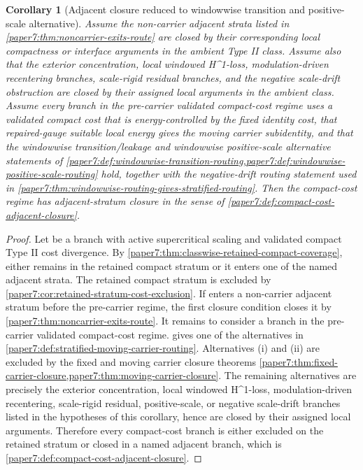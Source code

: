 \documentclass[11pt]{amsart}
\def\({}%
\def\){}%
\theoremstyle{plain}
\newtheorem{corollary}[corollary]{Corollary}
\theoremstyle{definition}
\theoremstyle{remark}
\begin{document}
\begin{corollary}[Adjacent closure reduced to windowwise transition and positive-scale alternative]
\label{paper7:cor:adjacent-closure-reduced-to-windowwise-routing}
Assume the non-carrier adjacent strata listed in
\cref{paper7:thm:noncarrier-exits-route} are closed by their corresponding
local compactness or interface arguments in the ambient Type II class.  Assume
also that the exterior concentration, local windowed \(H^1\)-loss,
modulation-driven recentering branches, scale-rigid residual branches, and the
negative scale-drift obstruction are closed by their assigned local arguments
in the ambient class.  Assume every branch in the pre-carrier validated
compact-cost regime uses a validated
compact cost that is energy-controlled by the fixed identity cost, that
repaired-gauge suitable local energy gives the moving carrier subidentity, and
that the windowwise transition/leakage and windowwise positive-scale alternative
statements of
\cref{paper7:def:windowwise-transition-routing,paper7:def:windowwise-positive-scale-routing}
hold, together with the negative-drift routing statement used in
\cref{paper7:thm:windowwise-routing-gives-stratified-routing}.  Then the
compact-cost regime has adjacent-stratum closure in the sense of
\cref{paper7:def:compact-cost-adjacent-closure}.
\end{corollary}

\begin{proof}
Let \(\omega\) be a branch with active supercritical scaling and validated
compact Type II cost divergence.  By
\cref{paper7:thm:classwise-retained-compact-coverage}, either \(\omega\)
remains in the retained compact stratum or it enters one of the named adjacent
strata.  The retained compact stratum is excluded by
\cref{paper7:cor:retained-stratum-cost-exclusion}.  If \(\omega\) enters a
non-carrier adjacent stratum before the pre-carrier regime, the first
closure condition closes it by \cref{paper7:thm:noncarrier-exits-route}.  It remains
to consider a branch in the pre-carrier validated compact-cost regime.
 gives one of
the alternatives in \cref{paper7:def:stratified-moving-carrier-routing}.
Alternatives \textup{(i)} and \textup{(ii)} are excluded by the fixed and
moving carrier closure theorems
\cref{paper7:thm:fixed-carrier-closure,paper7:thm:moving-carrier-closure}.
The remaining alternatives are precisely the exterior concentration, local
windowed \(H^1\)-loss, modulation-driven recentering, scale-rigid residual,
positive-scale, or negative scale-drift branches listed in the hypotheses of
this corollary, hence are closed by their assigned local arguments.  Therefore
every compact-cost branch is either excluded on the retained stratum or closed
in a named adjacent branch, which is
\cref{paper7:def:compact-cost-adjacent-closure}.
\end{proof}
\end{document}
